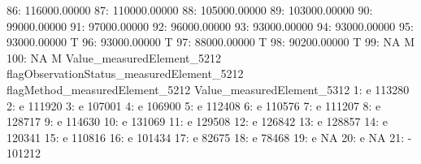 \documentclass[nojss]{jss}
\begin{document}
\begin{Schunk}
\begin{Soutput}
 86:               116000.00000                                           
 87:               110000.00000                                           
 88:               105000.00000                                           
 89:               103000.00000                                           
 90:                99000.00000                                           
 91:                97000.00000                                           
 92:                96000.00000                                           
 93:                93000.00000                                           
 94:                93000.00000                                           
 95:                93000.00000                                          T
 96:                93000.00000                                          T
 97:                88000.00000                                          T
 98:                90200.00000                                          T
 99:                         NA                                          M
100:                         NA                                          M
     Value_measuredElement_5212 flagObservationStatus_measuredElement_5212
     flagMethod_measuredElement_5212 Value_measuredElement_5312
  1:                               e                     113280
  2:                               e                     111920
  3:                               e                     107001
  4:                               e                     106900
  5:                               e                     112408
  6:                               e                     110576
  7:                               e                     111207
  8:                               e                     128717
  9:                               e                     114630
 10:                               e                     131069
 11:                               e                     129508
 12:                               e                     126842
 13:                               e                     128857
 14:                               e                     120341
 15:                               e                     110816
 16:                               e                     101434
 17:                               e                      82675
 18:                               e                      78468
 19:                               e                         NA
 20:                               e                         NA
 21:                               -                     101212

\end{Soutput}
\end{Schunk}
\end{document}

